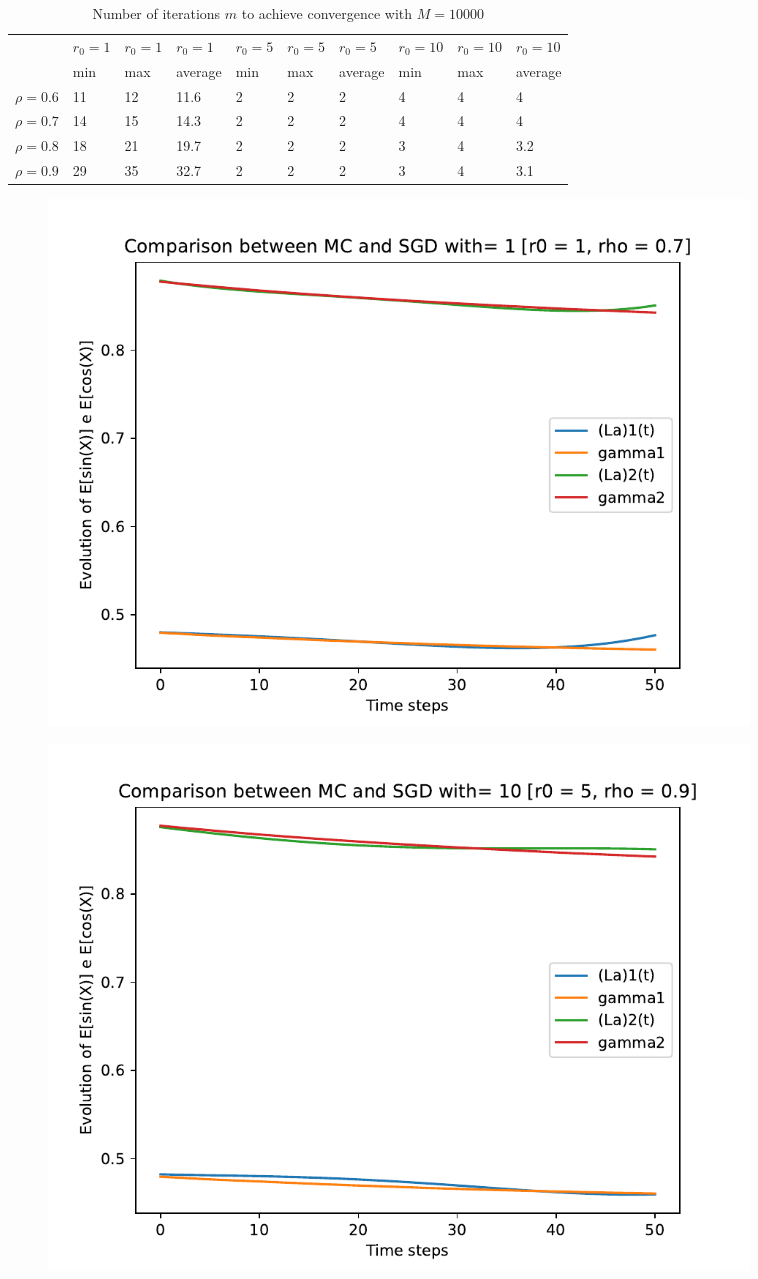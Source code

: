 \documentclass[a4paper,11pt,openright]{report}
\begin{document}
\begin{table}[H]
\centering
\addtolength{\leftskip}{-1.5cm}
\addtolength{\rightskip}{-1.5cm}
\begin{tabular}{|c|lllllllll|}
\hline
$ $ & $r_0 = 1$ & $r_0 = 1$ & $r_0 = 1$ & $r_0 = 5$ & $r_0 = 5$ & $r_0 = 5$ & $r_0 = 10$ & $r_0 = 10$ & $r_0 = 10$  \\
$ $ & min & max & average & min & max & average & min & max & average \\ 
\hline
$\rho = 0.6$ & 11 & 12 & 11.6 & 2 & 2 & 2 & 4 & 4 & 4\\

$\rho = 0.7$ & 14 & 15 & 14.3 & 2 & 2 & 2 & 4 & 4 & 4\\

$\rho = 0.8$ & 18 & 21 & 19.7 & 2 & 2 & 2 & 3 & 4 & 3.2\\

$\rho = 0.9$ & 29 & 35 & 32.7 & 2 & 2 & 2 & 3 & 4 & 3.1\\
\hline
\end{tabular}
\caption{Number of iterations $m$ to achieve convergence with $M = 10000$}
\end{table}
\begin{figure}[H]
\centering
\includegraphics[width=0.9\textwidth]{images/graphs T = 0.5/n = 4, M = 1 sine and cosine.pdf}
\end{figure}
\begin{figure}[H]
\centering
\includegraphics[width=0.9\textwidth]{images/graphs T = 0.5/n = 4, M = 10 sine and cosine.pdf}
\end{figure}
\end{document}
